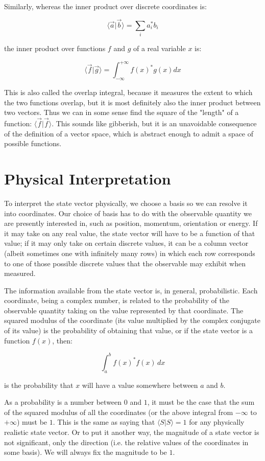 Similarly, whereas the inner product over discrete coordinates is:

$$
\langle \vec{a} | \vec{b} \rangle
=
\sum_i
a_i^* b_i
$$

the inner product over functions $f$ and $g$ of a real variable $x$ is:

$$
\langle \vec{f} | \vec{g} \rangle
=
\int_{-\infty}^{+\infty}
f(x)^* g(x)
dx
$$

This is also called the overlap integral, because it measures the extent to which the two functions overlap, but it is most definitely also the inner product between two vectors. Thus we can in some sense find the square of the "length" of a function: $\langle \vec{f} | \vec{f} \rangle$. This sounds like gibberish, but it is an unavoidable consequence of the definition of a vector space, which is abstract enough to admit a space of possible functions.

\section{Physical Interpretation}

To interpret the state vector physically, we choose a basis so we can resolve it into coordinates. Our choice of basis has to do with the observable quantity we are presently interested in, such as position, momentum, orientation or energy. If it may take on any real value, the state vector will have to be a function of that value; if it may only take on certain discrete values, it can be a column vector (albeit sometimes one with infinitely many rows) in which each row corresponds to one of those possible discrete values that the observable may exhibit when measured.

The information available from the state vector is, in general, probabilistic. Each coordinate, being a complex number, is related to the probability of the observable quantity taking on the value represented by that coordinate. The squared modulus of the coordinate (its value multiplied by the complex conjugate of its value) is the probability of obtaining that value, or if the state vector is a function $f(x)$, then:

$$\int_{a}^{b} f(x)^* f(x) \, dx$$

is the probability that $x$ will have a value somewhere between $a$ and $b$.

As a probability is a number between $0$ and $1$, it must be the case that the sum of the squared modulus of all the coordinates (or the above integral from $-\infty$ to $+\infty$) must be $1$. This is the same as saying that $\langle S | S \rangle = 1$ for any physically realistic state vector. Or to put it another way, the magnitude of a state vector is not significant, only the direction (i.e. the relative values of the coordinates in some basis). We will always fix the magnitude to be $1$.

